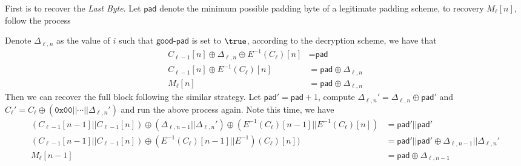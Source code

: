 \documentclass[11pt,a4paper]{article}
\begin{document}
First is to recover the \textit{Last Byte}. Let $\textsf{pad}$ denote the minimum possible padding byte of a legitimate padding scheme, to recovery $M_\ell[n]$, follow the process 
	\begin{pchstack}[ center , space=0.5cm]
	\end{pchstack}
	Denote $\Delta_{\ell,n}$ as the value of $i$ such that $\textsf{good-pad}$ is set to  $\true$, according to the decryption scheme, we have that 
	$$
	\begin{aligned}
		C_{\ell-1}[n] \oplus \Delta_{\ell,n} \oplus E^{-1}(C_\ell)[n] &= \textsf{pad} \\
		C_{\ell-1}[n] \oplus E^{-1}(C_\ell)[n] &= \textsf{pad} \oplus \Delta_{\ell,n} \\
		M_\ell[n] &= \textsf{pad} \oplus \Delta_{\ell,n} 
	\end{aligned}
	$$
Then we can recover the full block following the similar strategy. Let $\textsf{pad}' = \textsf{pad} + 1$, compute $\Delta_{\ell,n}' = \Delta_{\ell,n} \oplus \textsf{pad}'$ and $C_\ell' = C_\ell \oplus (\texttt{0x00} || \cdots || \Delta_{\ell,n}')$ and run the above process again. Note this time, we have  
$$
\begin{aligned}
	(C_{\ell-1}[n-1]||C_{\ell-1}[n]) \oplus (\Delta_{\ell,n-1} || \Delta_{\ell,n}') \oplus (E^{-1}(C_\ell)[n-1]||E^{-1}(C_\ell)[n]) &= \textsf{pad}' || \textsf{pad}'  \\
	(C_{\ell-1}[n-1]||C_{\ell-1}[n]) \oplus (E^{-1}(C_\ell)[n-1] ||E^{-1})(C_\ell)[n]) &= \textsf{pad}' || \textsf{pad}' \oplus \Delta_{\ell,n-1} || \Delta_{\ell,n}' \\
	M_\ell[n-1] &= \textsf{pad} \oplus \Delta_{\ell,n-1} 
\end{aligned}
$$
\end{document}
